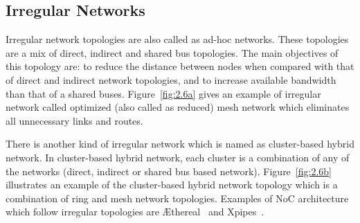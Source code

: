 \subsection{Irregular Networks}

Irregular network topologies are also called as ad-hoc networks. These topologies are a mix of direct, indirect and shared bus topologies. The main objectives of this topology are: to reduce the distance between nodes when compared with that of direct and indirect network topologies, and to increase available bandwidth than that of a shared buses. Figure~\ref{fig:2.6a} gives an example of irregular network called optimized (also called as reduced) mesh network which eliminates all unnecessary links and routes. 

There is another kind of irregular network which is named as cluster-based hybrid network. In cluster-based hybrid network, each cluster is a combination of any of the networks (direct, indirect or shared bus based network). Figure~\ref{fig:2.6b} illustrates an example of the cluster-based hybrid network topology which is a combination of ring and mesh network topologies. Examples of NoC architecture which follow irregular topologies are \AE{thereal}~\cite{Goossens} and Xpipes~\cite{Osso}.


